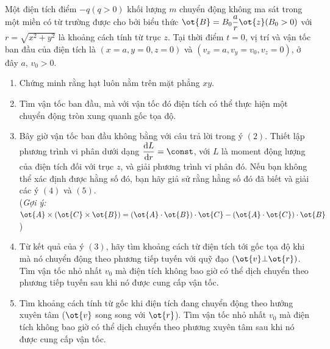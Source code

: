 \begin{vd}
Một điện tích điểm $-q(q>0)$ khối lượng $m$ chuyển động không ma sát trong một miền có từ trường được cho bởi biểu thức $\ot{B}=B_0\dfrac{a}{r}\ot{z} (B_0>0)$ với $r=\sqrt{x^2+y^2}$ là khoảng cách tính từ trục $z$. Tại thời điểm $t=0$, vị trí và vận tốc ban đầu của điện tích là $(x=a,y=0,z=0)$ và $(v_{x}=a,v_{y}=v_0,v_{z}=0)$, ở đây $a$, $v_0>0$.
\begin{enumerate}[1) ]
    \item Chứng minh rằng hạt luôn nằm trên mặt phẳng $xy$.
    \item Tìm vận tốc ban đầu, mà với vận tốc đó điện tích có thể thực hiện một chuyển động tròn xung quanh gốc tọa độ. 
    \item Bây giờ vận tốc ban đầu không bằng với câu trả lời trong ý $(2)$. Thiết lập phương trình vi phân dưới dạng $\dfrac{\mathrm{d}L}{\mathrm{d}r}=\const$, với $L$ là moment động lượng của điện tích đối với trục $z$, và giải phương trình vi phân đó. Nếu bạn không thể xác định được hằng số đó, bạn hãy giả sử rằng hằng số đó đã biết và giải các ý $(4)$ và $(5)$.\\
    (\textit{Gợi ý:} $\ot{A}\times(\ot{C}\times\ot{B})=(\ot{A}\cdot\ot{B})\cdot\ot{C}-(\ot{A}\cdot\ot{C})\cdot\ot{B}$) 
    \item Từ kết quả của ý $(3)$, hãy tìm khoảng cách từ điện tích tới gốc tọa độ khi mà nó chuyển động theo phương tiếp tuyến với quỹ đạo $(\ot{v}\bot \ot{r})$. Tìm vận tốc nhỏ nhất $v_0$ mà điện tích không bao giờ có thể dịch chuyển theo phương tiếp tuyến sau khi nó được cung cấp vận tốc.
    \item Tìm khoảng cách tính từ gốc khi điện tích đang chuyển động theo hướng xuyên tâm ($\ot{v}$ song song với $\ot{r}$). Tìm vận tốc nhỏ nhất $v_0$ mà điện tích không bao giờ có thể dịch chuyển theo phương xuyên tâm sau khi nó được cung cấp vận tốc.
\end{enumerate}
\end{vd}
